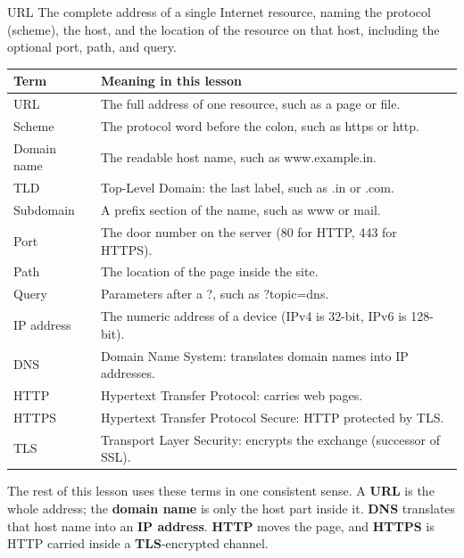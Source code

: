 \begin{definitionbox}{URL}
The complete address of a single Internet resource, naming the protocol
(scheme), the host, and the location of the resource on that host,
including the optional port, path, and query.
\end{definitionbox}

\begin{center}
\begin{tabular}{p{}p{}}
\toprule
\textbf{Term} & \textbf{Meaning in this lesson} \\
\midrule
URL & The full address of one resource, such as a page or file. \\
Scheme & The protocol word before the colon, such as https or http. \\
Domain name & The readable host name, such as www.example.in. \\
TLD & Top-Level Domain: the last label, such as .in or .com. \\
Subdomain & A prefix section of the name, such as www or mail. \\
Port & The door number on the server (80 for HTTP, 443 for HTTPS). \\
Path & The location of the page inside the site. \\
Query & Parameters after a ?, such as ?topic=dns. \\
IP address & The numeric address of a device (IPv4 is 32-bit, IPv6 is 128-bit). \\
DNS & Domain Name System: translates domain names into IP addresses. \\
HTTP & Hypertext Transfer Protocol: carries web pages. \\
HTTPS & Hypertext Transfer Protocol Secure: HTTP protected by TLS. \\
TLS & Transport Layer Security: encrypts the exchange (successor of SSL). \\
\bottomrule
\end{tabular}
\end{center}

The rest of this lesson uses these terms in one consistent sense. A
\textbf{URL} is the whole address; the \textbf{domain name} is only the host
part inside it. \textbf{DNS} translates that host name into an \textbf{IP
address}. \textbf{HTTP} moves the page, and \textbf{HTTPS} is HTTP carried
inside a \textbf{TLS}-encrypted channel.

